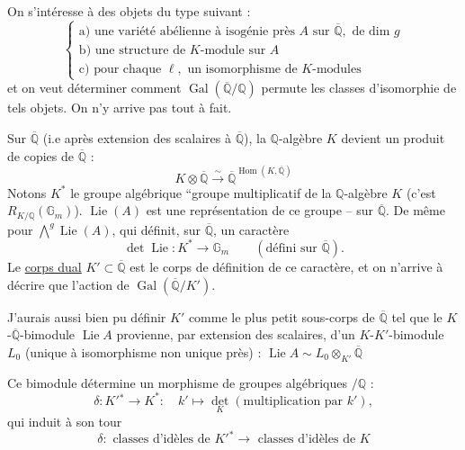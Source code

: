 On s'intéresse à des objets du type suivant :
\[
\left\{\begin{array}{l}
\text{a) une variété abélienne à isogénie près } A\text{ sur }\overline{\mathbb{Q}},\text{ de dim }g\\[4pt]
\text{b) une structure de }K\text{-module sur }A\\[4pt]
\text{c) pour chaque }\ell,\text{ un isomorphisme de }K\text{-modules}
\end{array}\right.
\]
et on veut déterminer comment $\operatorname{Gal}(\overline{\mathbb{Q}}/\mathbb{Q})$ permute les classes d'isomorphie de tels objets. On n'y arrive pas tout à fait.

Sur $\overline{\mathbb{Q}}$ (i.e après extension des scalaires à $\overline{\mathbb{Q}}$), la $\mathbb{Q}$-algèbre $K$ devient un produit de copies de $\overline{\mathbb{Q}}$ :
\[
K\otimes\overline{\mathbb{Q}}\xrightarrow{\sim}\overline{\mathbb{Q}}^{\operatorname{Hom}(K,\overline{\mathbb{Q}})}
\]
Notons $K^*$ le groupe algébrique ``groupe multiplicatif de la $\mathbb{Q}$-algèbre $K$ (c'est $R_{K/\mathbb{Q}}(\mathbb{G}_m)$). $\operatorname{Lie}(A)$ est une représentation de ce groupe -- sur $\overline{\mathbb{Q}}$.
De même pour $\bigwedge^g\operatorname{Lie}(A)$, qui définit, sur $\overline{\mathbb{Q}}$, un caractère
\[
\det\operatorname{Lie}:K^*\longrightarrow\mathbb{G}_m\qquad(\text{défini sur }\overline{\mathbb{Q}}).
\]
Le \uline{corps dual} $K'\subset\overline{\mathbb{Q}}$ est le corps de définition de ce caractère, et on n'arrive à décrire que l'action de $\operatorname{Gal}(\overline{\mathbb{Q}}/K')$.

J'aurais aussi bien pu définir $K'$ comme le plus petit sous-corps de $\overline{\mathbb{Q}}$ tel que le $K$-$\overline{\mathbb{Q}}$-bimodule $\operatorname{Lie} A$ provienne, par extension des scalaires, d'un $K$-$K'$-bimodule $L_0$ (unique à isomorphisme non unique près) : $\operatorname{Lie} A\sim L_0\otimes_{K'}\overline{\mathbb{Q}}$

Ce bimodule détermine un morphisme de groupes algébriques $/\mathbb{Q}$ :
\[
\delta:K'{}^*\longrightarrow K^*:\quad k'\longmapsto\det_K(\text{multiplication par }k'),
\]
qui induit à son tour
\[
\delta:\text{ classes d'idèles de }K'{}^*\longrightarrow\text{ classes d'idèles de }K
\]


